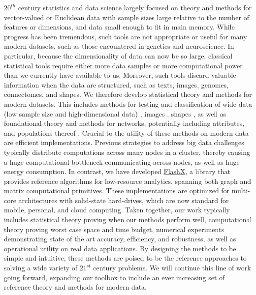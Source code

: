 \documentclass[11pt]{article}
\renewcommand{\para}[1]{\vspace{-10pt}\fontsize{10pt}{0pt}\paragraph{#1}}
\begin{document}
%
$20^{th}$ century  statistics and data science largely focused on theory and methods for vector-valued or Euclidean data with sample sizes large relative to the number of features or dimensions, and data small enough to fit in  main memory.
While progress has been tremendous, such tools are not appropriate or useful for many modern datasets, such as those encountered in genetics and neuroscience.  In particular, because the dimensionality of data can now be so large, classical statistical tools require either more data samples or more computational power than we currently have available to us.
Moreover, such tools discard valuable information when the data are structured, such as texts, images, genomes, connectomes, and shapes.
% 
We therefore develop statistical theory and methods for modern datasets.  This includes methods for testing and classification of wide data (low sample size and high-dimensional data) \cite{RerF,MGC},
images \cite{misha13}, shapes \cite{kutten2016deformably, kutten2016diffeomorphic},
as well as foundational theory and methods for  networks, potentially including attributes,  and populations thereof \cite{Vogelstein11a, Fiori13a, Koutra13a, Kulkarni2013, Lyzinski14b, Lyzinski14a, Airan15a, Chen15c, Koutra15a, Vogelstein15a, Durante14a, Binkiewicz2014, Vogelstein09b, Vogelstein13a, Vogelstein15b}.
%
Crucial to the utility of these methods on modern data are efficient implementations.
Previous strategies to address big data challenges  typically distribute computations across many nodes in a cluster, thereby causing a huge computational bottleneck communicating across nodes, as well as huge energy consumption.
In contrast, we have developed \href{http://flashx.io}{FlashX}, a library that provides reference algorithms for low-resource analytics,
spanning both graph \cite{Mhembere2013b,Zheng2014} and matrix \cite{zheng2016semi,zheng2016flashmatrix,knor} computational primitives.  These implementations are optimized for multi-core architectures with solid-state hard-drives, which are now standard for mobile, personal, and cloud computing.
%
Taken together, our work typically includes statistical theory proving when our methods perform well, computational theory proving worst case space and time budget, numerical experiments demonstrating state of the art accuracy, efficiency, and robustness, as well as operational utility on real data applications.
By designing the methods to be simple and intuitive, these methods are poised to be the reference approaches to solving a wide variety of $21^{st}$ century problems.
We will continue this line of work going forward, expanding our toolbox to include an ever increasing set of  reference theory and methods for modern data.
\end{document}
